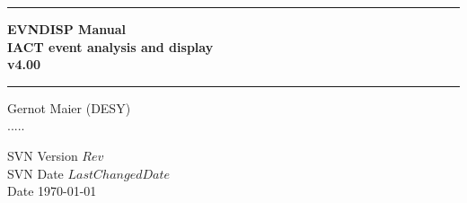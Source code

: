 
\newcommand{\HRule}{\rule{\linewidth}{1mm}}

\begin{titlepage}
\thispagestyle{empty}
\setlength{\parindent}{0mm}
\setlength{\parskip}{0mm}

\vspace*{10mm}
\HRule
\begin{flushright}
 \Huge \bf
  EVNDISP Manual \\
    IACT event analysis and display \\
     v4.00
\end{flushright}
\HRule
\vspace{10mm}
\begin{center}
   \Large
   
   \vspace{3.5cm}
  
   \vspace{0.5cm}
    
   \vspace{0.5cm}
   Gernot Maier (DESY) \\
   .....\\

   \vspace{6.3cm}

\end{center}
\begin{flushleft}
\Large
SVN Version $Rev$  \\
SVN Date $LastChangedDate$ \\
Date  \today \\

\end{flushleft}


\end{titlepage}
